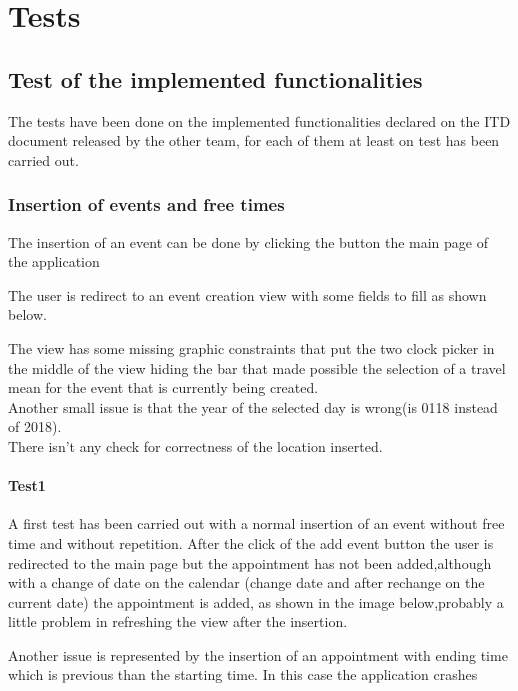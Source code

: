 \chapter{Tests}

\section{Test of the implemented functionalities}
The tests have been done on the implemented functionalities declared on the ITD document released by the other team, for each of them at least on test has been carried out.

\subsection{Insertion of events and free times}

The insertion of an event can be done by clicking the button the main page of the application


The user is redirect to an event creation view with some fields to fill as shown below.


The view has some missing graphic constraints that put the two clock picker in the middle of the view hiding the bar that made possible the selection of a travel mean for the event that is currently being created.\\
Another small issue is that the year of the selected day is wrong(is 0118 instead of 2018).\\
There isn't any check for correctness of the location inserted.\\
\subsubsection{Test1}
A first test has been carried out with a normal insertion of an event without free time and without repetition.
After the click of the add event button the user is redirected to the main page but the appointment has not been added,although with a change of date on the calendar (change date and after rechange on the current date) the appointment is added, as shown in the image below,probably a little problem in refreshing the view after the insertion.


Another issue is represented by the insertion of an appointment with ending time which is previous than the starting time. In this case the application crashes

